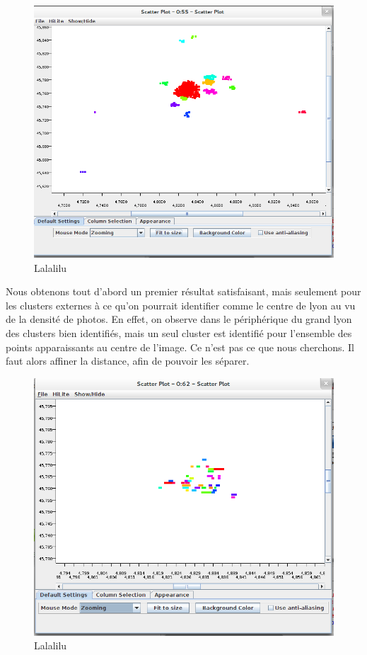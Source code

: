 \begin{figure}[H]
    \centering
    \includegraphics[width=\linewidth]{img/dbscan_50.png}
    \caption{Lalalilu}
\end{figure}

Nous obtenons tout d'abord un premier résultat satisfaisant, mais seulement pour les clusters externes à ce qu'on pourrait identifier comme le centre de lyon au vu de la densité de photos. En effet, on observe dans le périphérique du grand lyon des clusters bien identifiés, mais un seul cluster est identifié pour l'ensemble des points apparaissants au centre de l'image. Ce n'est pas ce que nous cherchons. Il faut alors affiner la distance, afin de pouvoir les séparer.



\begin{figure}[H]
    \centering
    \includegraphics[width=\linewidth]{img/dbscan_21.png}
    \caption{Lalalilu}
\end{figure}



